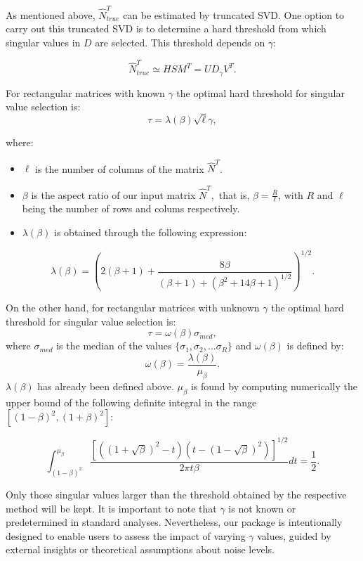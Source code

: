 As mentioned above, \(\hat{N}_{true}^T\) can be estimated by truncated SVD. One option to carry out this truncated SVD is to determine a hard threshold from which singular values in \(D\) are selected. This threshold depends on \(\gamma\):

\[\hat{N}_{true}^T \simeq HSM^T = U D_{\gamma}V^T.\]

For rectangular matrices with known \(\gamma\) the optimal hard threshold for singular value selection is:
\[\tau = \lambda(\beta)\sqrt{\ell}\gamma,\]

where:

\begin{itemize}
\tightlist
\item
  \(\ell\) is the number of columns of the matrix \(\hat{N}^T\).
\item
  \(\beta\) is the aspect ratio of our input matrix \(\hat{N}^T,\) that is, \(\beta = \frac{R}{\ell}\), with \(R\) and \(\ell\) being the number of rows and colums respectively.
\item
  \(\lambda(\beta)\) is obtained through the following expression:
\end{itemize}

\[\lambda(\beta) = \left (2(\beta + 1) + \frac{8\beta}{(\beta + 1) + (\beta^2 + 14\beta + 1)^{1/2}} \right)^{1/2}.\]

On the other hand, for rectangular matrices with unknown \(\gamma\) the optimal hard threshold for singular value selection is:
\[\tau = \omega(\beta)\sigma_{med},\]
where \(\sigma_{med}\) is the median of the values \(\{\sigma_{1}, \sigma_{2},... \sigma_{R}\}\) and \(\omega(\beta)\) is defined by:
\[\omega(\beta) = \frac{\lambda(\beta)}{\mu_{\beta}}.\]
\(\lambda(\beta)\) has already been defined above. \(\mu_{\beta}\) is found by computing numerically the upper bound of the following definite integral in the range \([(1-\beta)^2,(1+\beta)^2]\):

\[\int_{(1-\beta)^2}^{\mu_{\beta}}\frac{\left[ \left((1 + \sqrt{\beta})^2 -t \right) \left( t - (1 - \sqrt{\beta})^2\right)\right]^{1/2}}{2\pi t \beta}dt = \frac{1}{2}.\]

Only those singular values larger than the threshold obtained by the respective method will be kept. It is important to note that \(\gamma\) is not known or predetermined in standard analyses. Nevertheless, our package is intentionally designed to enable users to assess the impact of varying \(\gamma\) values, guided by external insights or theoretical assumptions about noise levels.

